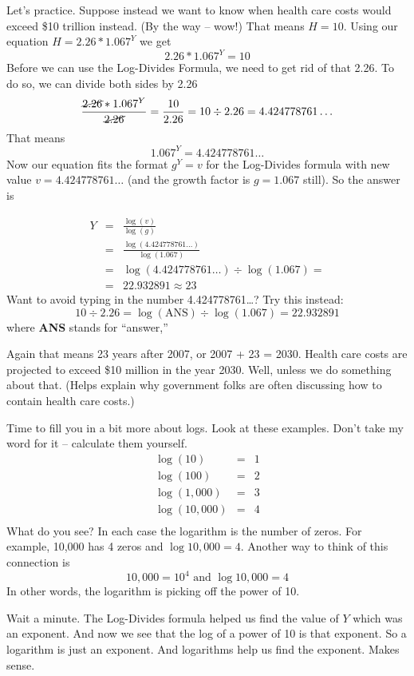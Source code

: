 Let's practice. Suppose instead we want to know when health care costs would exceed \$10 trillion instead.  (By the way -- wow!)  That means $H = 10$.  Using our equation $H=2.26\ast1.067^Y$ we get $$2.26\ast1.067^Y=10$$
Before we can use the Log-Divides Formula, we need to get rid of that 2.26.  To do so, we can divide both sides by 2.26
$$\frac{\cancel{2.26}\ast1.067^Y}{\cancel{2.26}}=\frac{10}{2.26}=10 \div 2.26 = 4.424778761\ldots$$ 
That means
$$1.067^Y=4.424778761\ldots$$
Now our equation fits the format $g^Y=v$ for the Log-Divides formula with new value $v=4.424778761\ldots$ (and the growth factor is $g=1.067$ still).  So the answer is 

\begin{eqnarray*}
Y & = &  \frac{\log (v)}{\log(g)}\\
& = &  \frac{\log (4.424778761\ldots)}{\log(1.067)}\\
& =  &  \log (4.424778761\ldots) \div \log (1.067) = \\
& =  &  22.932891 \approx 23 
\end{eqnarray*}
Want to avoid typing in the number 4.424778761\ldots? Try this instead:
$$10 \div 2.26 = \log(\text{ANS}) \div \log(1.067)= 22.932891$$
where \textbf{ANS} stands for ``answer,''

Again that means 23 years after 2007, or 2007 + 23 = 2030.  Health care costs are projected to exceed \$10 million in the year 2030.  Well, unless we do something about that.  (Helps explain why government folks are often discussing how to contain health care costs.)

Time to fill you in a bit more about logs.  Look at these examples.  Don't take my word for it -- calculate them yourself.
\begin{eqnarray*}
\log (10) & = & 1 \\
\log (100) & = & 2 \\
\log (1,000) & = & 3 \\
\log (10,000) & = & 4 \\
\end{eqnarray*}
What do you see?  In each case the logarithm is the number of zeros.  For example, 10,000 has 4 zeros and $\log 10,000=4$.  Another way to think of this connection is $$ 10,000 = 10^4 \text{ and } \log 10,000=4$$ In other words, the logarithm is picking off the power of 10.  

Wait a minute.  The Log-Divides formula helped us find the value of $Y$ which was an exponent.   And now we see that the log of a power of 10 is that exponent.  So a logarithm is just an exponent. And logarithms help us find the exponent.  Makes sense.

